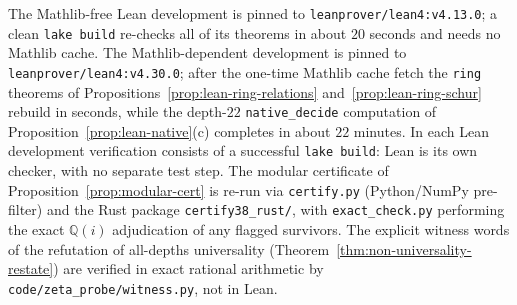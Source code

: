 \documentclass[11pt]{article}
\theoremstyle{plain}
\theoremstyle{definition}
\theoremstyle{remark}
\begin{document}
The Mathlib-free Lean development is pinned to
\texttt{leanprover/lean4:v4.13.0}; a clean \texttt{lake build} re-checks
all of its theorems in about $20$ seconds and needs no Mathlib cache. The
Mathlib-dependent development is pinned to
\texttt{leanprover/lean4:v4.30.0}; after the one-time Mathlib cache fetch
the \texttt{ring} theorems of
Propositions~\ref{prop:lean-ring-relations}
and~\ref{prop:lean-ring-schur} rebuild in seconds, while the depth-$22$
\texttt{native\_decide} computation of Proposition~\ref{prop:lean-native}(c)
completes in about $22$ minutes. In each Lean development verification
consists of a successful \texttt{lake build}: Lean is its own checker,
with no separate test step. The modular certificate of
Proposition~\ref{prop:modular-cert} is re-run via \texttt{certify.py}
(Python/NumPy pre-filter) and the Rust package \texttt{certify38\_rust/},
with \texttt{exact\_check.py} performing the exact $\mathbb{Q}(i)$
adjudication of any flagged survivors. The explicit witness words of the
refutation of all-depths universality
(Theorem~\ref{thm:non-universality-restate}) are verified in exact rational
arithmetic by \texttt{code/zeta\_probe/witness.py}, not in Lean.
\end{document}
